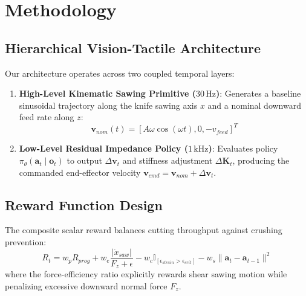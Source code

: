 \section{Methodology}
\label{sec:method}

\subsection{Hierarchical Vision-Tactile Architecture}
Our architecture operates across two coupled temporal layers:
\begin{enumerate}
    \item \textbf{High-Level Kinematic Sawing Primitive ($30\,\text{Hz}$)}: Generates a baseline sinusoidal trajectory along the knife sawing axis $x$ and a nominal downward feed rate along $z$:
    \begin{equation}
        \mathbf{v}_{nom}(t) = [A \omega \cos(\omega t), 0, -v_{feed}]^T
    \end{equation}
    \item \textbf{Low-Level Residual Impedance Policy ($1\,\text{kHz}$)}: Evaluates policy $\pi_\theta(\mathbf{a}_t \mid \mathbf{o}_t)$ to output $\Delta \mathbf{v}_t$ and stiffness adjustment $\Delta \mathbf{K}_t$, producing the commanded end-effector velocity $\mathbf{v}_{cmd} = \mathbf{v}_{nom} + \Delta \mathbf{v}_t$.
\end{enumerate}

\subsection{Reward Function Design}
The composite scalar reward balances cutting throughput against crushing prevention:
\begin{equation}
    R_t = w_{p} R_{prog} + w_{e} \frac{|\dot{x}_{saw}|}{F_{z} + \epsilon} - w_{c} \mathbb{I}_{[\epsilon_{strain} > \epsilon_{crit}]} - w_{s} \|\mathbf{a}_t - \mathbf{a}_{t-1}\|^2
\end{equation}
where the force-efficiency ratio explicitly rewards shear sawing motion while penalizing excessive downward normal force $F_z$.
